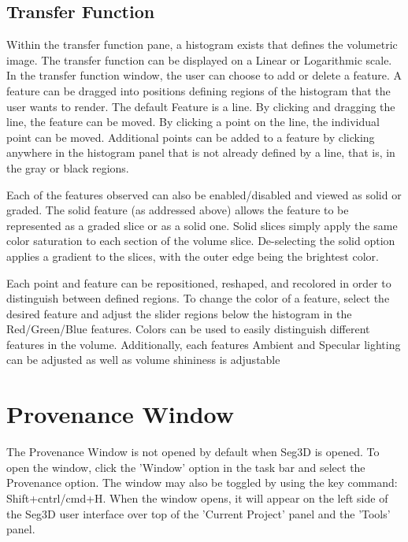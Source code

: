 \documentclass[fleqn,11pt,openany]{book}
\begin{document}


\subsection{Transfer Function}
Within the transfer function pane, a histogram exists that defines the volumetric image.
The transfer function can be displayed on a Linear or Logarithmic scale.
In the transfer function window, the user can choose to add or delete a feature.
A feature can be dragged into positions defining regions of the histogram that the user wants to render.
The default Feature is a line.  
By clicking and dragging the line, the feature can be moved.
By clicking a point on the line, the individual point can be moved.
Additional points can be added to a feature by clicking anywhere in the histogram panel  that is not already defined by a line, that is, in the gray or black regions.

Each of the features observed can also be enabled/disabled and viewed as solid or graded.
The solid feature (as addressed above) allows the feature to be represented as a graded slice or as a solid one.
Solid slices simply apply the same color saturation to each section of the volume slice.
De-selecting the solid option applies a gradient to the slices, with the outer edge being the brightest color.

Each point and feature can be repositioned, reshaped, and recolored in order to distinguish between defined regions.
To change the color of a feature, select the desired feature and adjust the slider regions below the histogram in the Red/Green/Blue features.
Colors can be used to easily distinguish different features in the volume.
Additionally, each features Ambient and Specular lighting can be adjusted as well as volume shininess is adjustable



\section{Provenance Window}
The Provenance Window is not opened by default when Seg3D is opened. 
To open the window, click the 'Window' option in the task bar and select the Provenance option.  
The window may also be toggled by using the key command: Shift+cntrl/cmd+H.
When the window opens, it will appear on the left side of the Seg3D user interface over top of the 'Current Project' panel and the 'Tools' panel.
\end{document}
